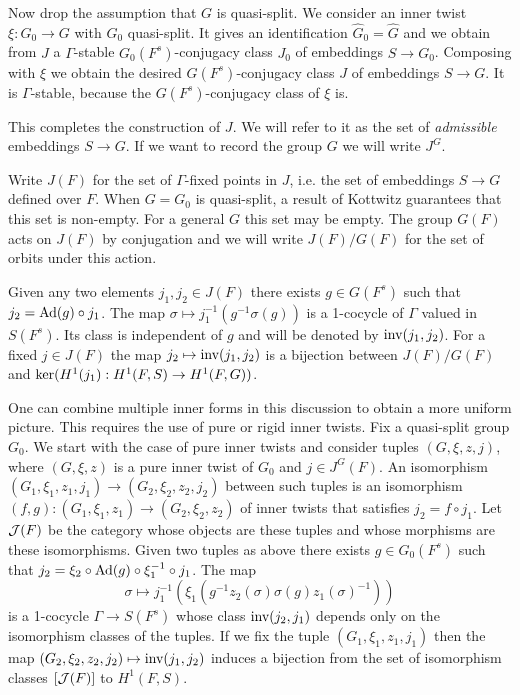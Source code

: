 \documentclass{article}
\theoremstyle{definition}
\numberwithin{equation}{section}
\renewcommand{\-}{\hyp{}}
\begin{document}
Now drop the assumption that $G$ is quasi-split. We consider an inner twist $\xi : G_0 \to G$ with $G_0$ quasi-split. It gives an identification $\hat G_0=\hat G$ and we obtain from $\hat J$ a $\Gamma$-stable $G_0(F^s)$-conjugacy class $J_0$ of embeddings $S \to G_0$. Composing with $\xi$ we obtain the desired $G(F^s)$-conjugacy class $J$ of embeddings $S \to G$. It is $\Gamma$-stable, because the $G(F^s)$-conjugacy class of $\xi$ is.

This completes the construction of $J$. We will refer to it as the set of \emph{admissible} embeddings $S \to G$. If we want to record the group $G$ we will write $J^G$.

Write $J(F)$ for the set of $\Gamma$-fixed points in $J$, i.e. the set of embeddings $S \to G$ defined over $F$. When $G=G_0$ is quasi-split, a result of Kottwitz \cite[Corollary 2.2]{Kot82} guarantees that this set is non-empty. For a general $G$ this set may be empty. The group $G(F)$ acts on $J(F)$ by conjugation and we will write $J(F)/G(F)$ for the set of orbits under this action.

Given any two elements $j_1,j_2 \in J(F)$ there exists $g \in G(F^s)$ such that $j_2 = \textrm{Ad}(g)\circ j_1$. The map $\sigma \mapsto j_1^{-1}(g^{-1}\sigma(g))$ is a 1-cocycle of $\Gamma$ valued in $S(F^s)$. Its class is independent of $g$ and will be denoted by $\textrm{inv}(j_1,j_2)$. For a fixed $j \in J(F)$ the map $j_2 \mapsto \textrm{inv}(j_1,j_2)$ is a bijection between $J(F)/G(F)$ and $\textrm{ker}(H^1(j_1) : H^1(F,S) \to H^1(F,G))$.

One can combine multiple inner forms in this discussion to obtain a more uniform picture. This requires the use of pure or rigid inner twists. Fix a quasi-split group $G_0$. We start with the case of pure inner twists and consider tuples $(G,\xi,z,j)$, where $(G,\xi,z)$ is a pure inner twist of $G_0$ and $j \in J^G(F)$. An isomorphism $(G_1,\xi_1,z_1,j_1) \to (G_2,\xi_2,z_2,j_2)$ between such tuples is an isomorphism $(f,g) : (G_1,\xi_1,z_1) \to (G_2,\xi_2,z_2)$ of inner twists that satisfies $j_2=f\circ j_1$. Let $\mathcal{J}(F)$ be the category whose objects are these tuples and whose morphisms are these isomorphisms. Given two tuples as above there exists $g \in G_0(F^s)$ such that $j_2 = \xi_2 \circ \textrm{Ad}(g)\circ\xi_1^{-1}\circ j_1$. The map 
\[ \sigma \mapsto j_1^{-1}(\xi_1(g^{-1}z_2(\sigma)\sigma(g)z_1(\sigma)^{-1})) \] 
is a 1-cocycle $\Gamma \to S(F^s)$ whose class $\textrm{inv}(j_2,j_1)$ depends only on the isomorphism classes of the tuples. If we fix the tuple $(G_1,\xi_1,z_1,j_1)$ then the map $(G_2,\xi_2,z_2,j_2) \mapsto \textrm{inv}(j_1,j_2)$ induces a bijection from the set of isomorphism classes $[\mathcal{J}(F)]$ to $H^1(F,S)$.
\end{document}
